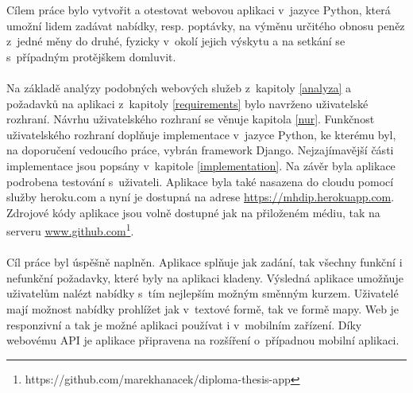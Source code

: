 \begin{conclusion}
Cílem práce bylo vytvořit a otestovat webovou aplikaci v~jazyce Python, která umožní lidem zadávat nabídky, resp. poptávky, na výměnu určitého obnosu peněz z~jedné měny do druhé, fyzicky v~okolí jejich výskytu a na setkání se s~případným protějškem domluvit.
\\\\
Na základě analýzy podobných webových služeb z~kapitoly \ref{analyza} a požadavků na aplikaci z~kapitoly \ref{requirements} bylo navrženo uživatelské rozhraní. Návrhu uživatelského rozhraní se věnuje kapitola \ref{nur}. Funkčnost uživatelského rozhraní doplňuje implementace v~jazyce Python, ke kterému byl, na doporučení vedoucího práce, vybrán framework Django. Nejzajímavější části implementace jsou popsány v~kapitole \ref{implementation}. Na závěr byla aplikace podrobena testování s~uživateli. Aplikace byla také nasazena do cloudu pomocí služby heroku.com \cite{heroku} a nyní je dostupná na adrese \url{https://mhdip.herokuapp.com}. Zdrojové kódy aplikace jsou volně dostupné jak na přiloženém médiu, tak na serveru \url{www.github.com}\footnote{https://github.com/marekhanacek/diploma-thesis-app}.
\\\\
Cíl práce byl úspěšně naplněn. Aplikace splňuje jak zadání, tak všechny funkční i nefunkční požadavky, které byly na aplikaci kladeny. Výsledná aplikace umožňuje uživatelům nalézt nabídky s~tím nejlepším možným směnným kurzem. Uživatelé mají možnost nabídky prohlížet jak v~textové formě, tak ve formě mapy. Web je responzivní a tak je možné aplikaci používat i v~mobilním zařízení. Díky webovému API je aplikace připravena na rozšíření o~případnou mobilní aplikaci.
\end{conclusion}